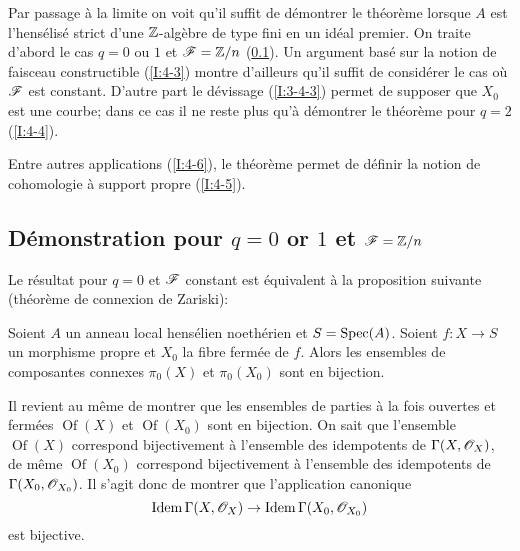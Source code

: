 \documentclass[oneside]{book}
\begin{document}
Par passage à la limite on voit qu'il suffit de démontrer le théorème 
lorsque $A$ est l'hensélisé strict d'une $\mathbb{Z}$-algèbre  de type fini en 
un idéal premier. On traite d'abord le cas $q=0$ ou $1$ et $\mathscr{F}=\mathbb{Z}/n$ 
(\ref{I:4-2}). Un argument basé sur la notion de faisceau constructible 
(\ref{I:4-3}) montre d'ailleurs qu'il suffit de considérer le cas où $\mathscr{F}$ est 
constant. D'autre part le dévissage (\ref{I:3-4-3}) permet de supposer que 
$X_0$ est une courbe; dans ce cas il ne reste plus qu'à démontrer le 
théorème pour $q=2$ (\ref{I:4-4}). 

Entre autres applications (\ref{I:4-6}), le théorème permet de définir la notion 
de cohomologie à support propre (\ref{I:4-5}). 










\subsection{Démonstration pour \texorpdfstring{$q=0$}{q=1} or \texorpdfstring{$1$}{1} et \texorpdfstring{$\mathscr{F}=\mathbb{Z}/n$}{\cF=Z/n}}\label{I:4-2} 

Le résultat pour $q=0$ et $\mathscr{F}$ constant est équivalent à la proposition 
suivante (théorème de connexion de Zariski):





\begin{proposition}\label{I:4-2-1}
Soient $A$ un anneau local hensélien noethérien et $S=\operatorname{Spec}(A)$. 
Soient $f:X\to S$ un morphisme propre et $X_0$ la fibre fermée de $f$. Alors 
les ensembles de composantes connexes $\pi_0(X)$ et $\pi_0(X_0)$ sont en 
bijection.
\end{proposition}

Il revient au même de montrer que les ensembles de parties à la fois 
ouvertes et fermées $\operatorname{Of}(X)$ et $\operatorname{Of}(X_0)$ sont 
en bijection. On sait que l'ensemble $\operatorname{Of}(X)$ correspond 
bijectivement à l'ensemble des idempotents de $\Gamma(X,\mathscr{O}_X)$, de même 
$\operatorname{Of}(X_0)$ correspond bijectivement à l'ensemble des 
idempotents de $\Gamma(X_0,\mathscr{O}_{X_0})$. Il s'agit donc de montrer que 
l'application canonique 
\[
  \operatorname{Idem} \Gamma(X,\mathscr{O}_X) \to \operatorname{Idem}\Gamma(X_0,\mathscr{O}_{X_0})
\]
est bijective. 
\end{document}
